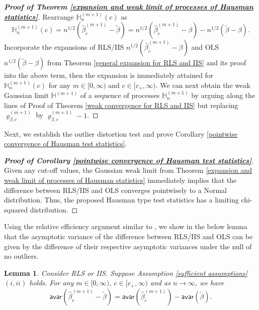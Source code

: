 \documentclass[11pt, letterpaper]{article}
\newtheorem{lemma}{Lemma}
\numberwithin{algorithm}{section}
\numberwithin{assumption}{section}
\numberwithin{lemma}{section}
\numberwithin{theorem}{section}
\numberwithin{corollary}{section}
\numberwithin{remark}{section}
\numberwithin{equation}{section}
\numberwithin{figure}{section}
\numberwithin{table}{section}
\begin{document}
\begin{proof}[\textnormal{\textbf{Proof of Theorem \ref{expansion and weak limit of processes of Hausman statistics}}}]
Rearrange $\mathbb{H}_{n}^{(m + 1)}(c)$ as
\begin{equation*}
\mathbb{H}_{n}^{(m + 1)}(c) = n^{1/2} (\widehat{\beta}_{c}^{(m + 1)} - \widetilde{\beta}) = n^{1/2} (\widehat{\beta}_{c}^{(m + 1)} - \beta) - n^{1/2} (\widetilde{\beta} - \beta).
\end{equation*}
Incorporate the expansions of RLS/IIS $n^{1/2} (\widehat{\beta}_{c}^{(m + 1)} - \beta)$ and OLS $n^{1/2} (\widetilde{\beta} - \beta)$ from Theorem \ref{general expansion for RLS and IIS} and its proof into the above term, then the expansion is immediately attained for $\mathbb{H}_{n}^{(m + 1)}(c)$ for any $m \in [0, \infty)$ and $c \in [c_{+}, \infty)$. We can next obtain the weak Gaussian limit $\mathbb{H}^{(m + 1)}$ of a sequence of processes $\mathbb{H}_{n}^{(m + 1)}$ by arguing along the lines of Proof of Theorem \ref{weak convergence for RLS and IIS} but replacing $\varrho_{\beta, c}^{(m + 1)}$ by $\varrho_{\beta, c}^{(m + 1)} - 1$.
\end{proof}

Next, we establish the outlier distortion test and prove Corollary \ref{pointwise convergence of Hausman test statistics}.

\begin{proof}[\textnormal{\textbf{Proof of Corollary \ref{pointwise convergence of Hausman test statistics}}}]
Given any cut-off values, the Gaussian weak limit from Theorem \ref{expansion and weak limit of processes of Hausman statistics} immediately implies that the difference between RLS/IIS and OLS converges pointwisely to a Normal distribution. Thus, the proposed Hausman type test statistics has a limiting chi-squared distribution.
\end{proof}

Using the relative efficiency argument similar to \cite{hausman1978specification}, we show in the below lemma that the asymptotic variance of the difference between RLS/IIS and OLS can be given by the difference of their respective asymptotic variances under the null of no outliers.

\begin{lemma} \label{equality for asymptotic variance of difference}
Consider RLS or IIS. Suppose Assumption \ref{sufficient assumptions}$(i, ii)$ holds. For any $m \in [0, \infty)$, $c \in [c_{+}, \infty)$ and as $n \to \infty$, we have
\begin{equation*}
\mathsf{avar}(\widehat{\beta}_{c}^{(m + 1)} - \widetilde{\beta}) = \mathsf{avar}(\widehat{\beta}_{c}^{(m + 1)}) - \mathsf{avar}(\widetilde{\beta}).
\end{equation*}
\end{lemma}
\end{document}
